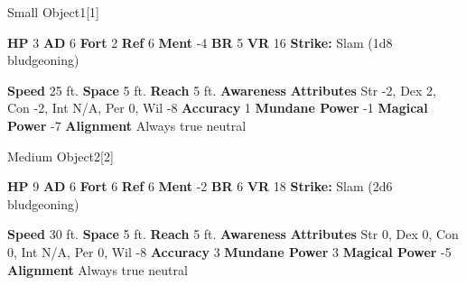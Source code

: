   \begin{monsubsection}{Small Object}{1}[1]
    \vspace{-1em}\vspace{-1em}
    \vspace{0em}

    
    

    \begin{spellcontent}
      \begin{spelltargetinginfo}
        \pari \textbf{HP} 3 \monsep
          \textbf{AD} 6 \monsep
          \textbf{Fort} 2 \monsep
          \textbf{Ref} 6 \monsep
          \textbf{Ment} -4
        \pari \textbf{BR} 5 \monsep
        \textbf{VR} 16
        \pari \textbf{Strike:}
            Slam  (1d8 bludgeoning)
      \end{spelltargetinginfo}
    \end{spellcontent}
    \begin{monsterfooter}
      \pari \textbf{Speed} 25 ft. \monsep
        \textbf{Space} 5 ft. \monsep
        \textbf{Reach} 5 ft.
      \pari \textbf{Awareness} 
      \pari \textbf{Attributes}
        Str -2, Dex 2,
        Con -2, Int N/A,
        Per 0, Wil -8
      \pari \textbf{Accuracy} 1 \monsep
        \textbf{Mundane Power} -1 \monsep
      \textbf{Magical Power} -7
      \pari \textbf{Alignment} Always true neutral
    \end{monsterfooter}
  \end{monsubsection}
  
  

  \begin{monsubsection}{Medium Object}{2}[2]
    \vspace{-1em}\vspace{-1em}
    \vspace{0em}

    
    

    \begin{spellcontent}
      \begin{spelltargetinginfo}
        \pari \textbf{HP} 9 \monsep
          \textbf{AD} 6 \monsep
          \textbf{Fort} 6 \monsep
          \textbf{Ref} 6 \monsep
          \textbf{Ment} -2
        \pari \textbf{BR} 6 \monsep
        \textbf{VR} 18
        \pari \textbf{Strike:}
            Slam  (2d6 bludgeoning)
      \end{spelltargetinginfo}
    \end{spellcontent}
    \begin{monsterfooter}
      \pari \textbf{Speed} 30 ft. \monsep
        \textbf{Space} 5 ft. \monsep
        \textbf{Reach} 5 ft.
      \pari \textbf{Awareness} 
      \pari \textbf{Attributes}
        Str 0, Dex 0,
        Con 0, Int N/A,
        Per 0, Wil -8
      \pari \textbf{Accuracy} 3 \monsep
        \textbf{Mundane Power} 3 \monsep
      \textbf{Magical Power} -5
      \pari \textbf{Alignment} Always true neutral
    \end{monsterfooter}
  \end{monsubsection}
  
